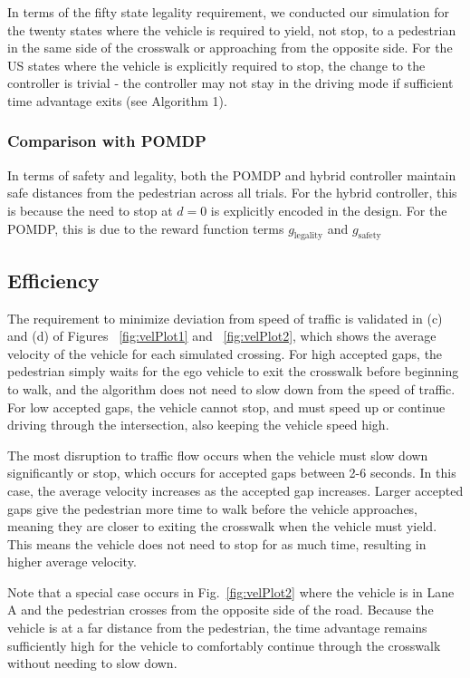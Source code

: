 \documentclass[letterpaper, 10 pt, conference]{ieeeconf}  %
\begin{document}
In terms of the fifty state legality requirement, we conducted our simulation for the twenty states where the vehicle is required to yield, not stop, to a pedestrian in the same side of the crosswalk or approaching from the opposite side. For the US states where the vehicle is explicitly required to stop, the change to the controller is trivial - the controller may not stay in the driving mode if sufficient time advantage exits (see Algorithm 1). 

\subsubsection{Comparison with POMDP}

In terms of safety and legality, both the POMDP and hybrid controller maintain safe distances from the pedestrian across all trials. For the hybrid controller, this is because the need to stop at $d=0$ is explicitly encoded in the design. For the POMDP, this is due to the reward function terms $g_\mathrm{legality}$ and $g_\mathrm{safety}$  

\subsection{Efficiency}

The requirement to minimize deviation from speed of traffic is validated in (c) and (d) of Figures ~\ref{fig:velPlot1} and ~\ref{fig:velPlot2}, which shows the average velocity of the vehicle for each simulated crossing. For high accepted gaps, the pedestrian simply waits for the ego vehicle to exit the crosswalk before beginning to walk, and the algorithm does not need to slow down from the speed of traffic. For low accepted gaps, the vehicle cannot stop, and must speed up or continue driving through the intersection, also keeping the vehicle speed high.  

The most disruption to traffic flow occurs when the vehicle must slow down significantly or stop, which occurs for accepted gaps between 2-6 seconds. In this case, the average velocity increases as the accepted gap increases. Larger accepted gaps give the pedestrian more time to walk before the vehicle approaches, meaning they are closer to exiting the crosswalk when the vehicle must yield. This means the vehicle does not need to stop for as much time, resulting in higher average velocity. 

Note that a special case occurs in Fig.~\ref{fig:velPlot2} where the vehicle is in Lane A and the pedestrian crosses from the opposite side of the road. Because the vehicle is at a far distance from the pedestrian, the time advantage remains sufficiently high for the vehicle to comfortably continue through the crosswalk without needing to slow down. 
\end{document}
